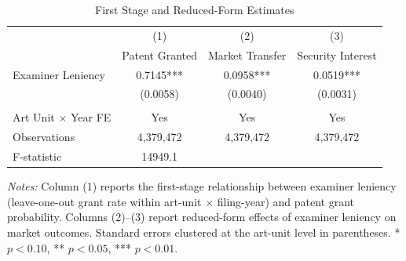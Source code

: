 \begin{table}[H]
\centering
\caption{First Stage and Reduced-Form Estimates}
\label{tab:firststage}
\begin{threeparttable}
\begin{tabular}{lccc}
\toprule
 & (1) & (2) & (3) \\
 & Patent Granted & Market Transfer & Security Interest \\
\midrule
Examiner Leniency & 0.7145*** & 0.0958*** & 0.0519*** \\
 & (0.0058) & (0.0040) & (0.0031) \\
\\
Art Unit $\times$ Year FE & Yes & Yes & Yes \\
Observations & 4,379,472 & 4,379,472 & 4,379,472 \\
F-statistic & 14949.1 & & \\
\bottomrule
\end{tabular}
\begin{tablenotes}[flushleft]
\small
\item \textit{Notes:} Column (1) reports the first-stage relationship between examiner leniency (leave-one-out grant rate within art-unit $\times$ filing-year) and patent grant probability. Columns (2)--(3) report reduced-form effects of examiner leniency on market outcomes. Standard errors clustered at the art-unit level in parentheses. * $p<0.10$, ** $p<0.05$, *** $p<0.01$.
\end{tablenotes}
\end{threeparttable}
\end{table}
